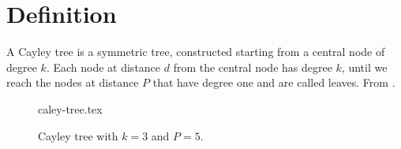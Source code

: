\section{Definition}

    A Cayley tree is a symmetric tree, constructed starting from a central node of degree $k$. Each node at distance $d$ from the central node has degree $k$, until we reach the nodes at distance $P$ that have degree one and are called leaves. From \cite{barabasi}.

    \begin{figure}[H]
        \centering
        \def\svgwidth{0.5\textwidth}
        {caley-tree.tex}

        \caption{Cayley tree with $k = 3$ and $P = 5$.}
    \end{figure}
